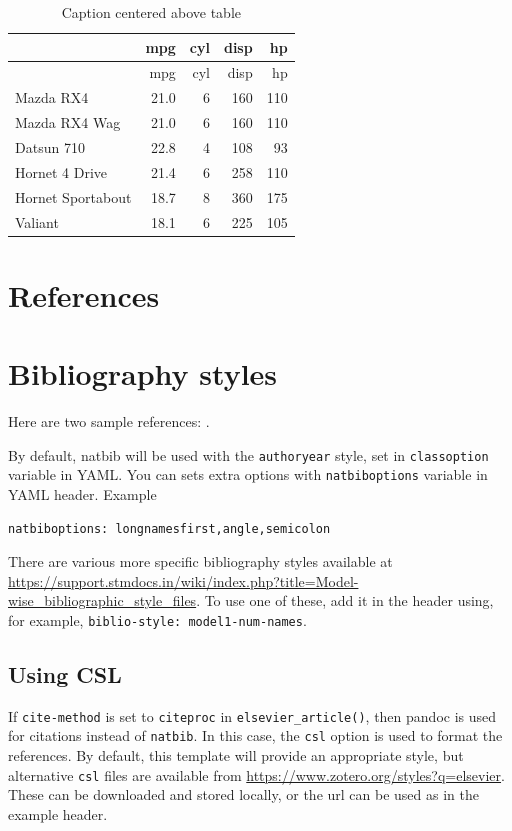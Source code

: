 \documentclass[
  super,
  preprint,
  3p]{elsarticle}
\begin{document}
\hypertarget{tbl-simple}{}
\begin{longtable}[]{@{}lrrrr@{}}
\caption{\label{tbl-simple}Caption centered above table}\tabularnewline
\toprule\noalign{}
& mpg & cyl & disp & hp \\
\midrule\noalign{}
\endfirsthead
\toprule\noalign{}
& mpg & cyl & disp & hp \\
\midrule\noalign{}
\endhead
\bottomrule\noalign{}
\endlastfoot
Mazda RX4 & 21.0 & 6 & 160 & 110 \\
Mazda RX4 Wag & 21.0 & 6 & 160 & 110 \\
Datsun 710 & 22.8 & 4 & 108 & 93 \\
Hornet 4 Drive & 21.4 & 6 & 258 & 110 \\
Hornet Sportabout & 18.7 & 8 & 360 & 175 \\
Valiant & 18.1 & 6 & 225 & 105 \\
\end{longtable}

\hypertarget{references}{%
\section*{References}\label{references}}

\hypertarget{bibliography-styles}{%
\section{Bibliography styles}\label{bibliography-styles}}

Here are two sample references: \citet{Feynman1963118}
\citet{Dirac1953888}.

By default, natbib will be used with the \texttt{authoryear} style, set
in \texttt{classoption} variable in YAML. You can sets extra options
with \texttt{natbiboptions} variable in YAML header. Example

\begin{verbatim}
natbiboptions: longnamesfirst,angle,semicolon
\end{verbatim}

There are various more specific bibliography styles available at
\url{https://support.stmdocs.in/wiki/index.php?title=Model-wise_bibliographic_style_files}.
To use one of these, add it in the header using, for example,
\texttt{biblio-style:\ model1-num-names}.

\hypertarget{using-csl}{%
\subsection{Using CSL}\label{using-csl}}

If \texttt{cite-method} is set to \texttt{citeproc} in
\texttt{elsevier\_article()}, then pandoc is used for citations instead
of \texttt{natbib}. In this case, the \texttt{csl} option is used to
format the references. By default, this template will provide an
appropriate style, but alternative \texttt{csl} files are available from
\url{https://www.zotero.org/styles?q=elsevier}. These can be downloaded
and stored locally, or the url can be used as in the example header.


  
\end{document}
